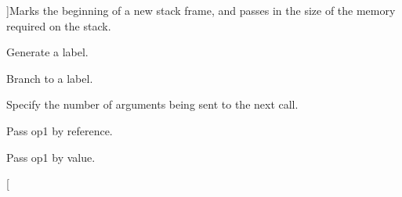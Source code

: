 \begin{Desc}
\begin{description}
{}]Marks the beginning of a new stack frame, and passes in the size of the memory required on the stack. \item[{\em 
\hypertarget{classTAC__Generator_ab58b7044cb5d16a454f4e01514175123a65bcd8393762141e07f6f31fe50fe5b9}{L\-A\-B\-E\-L}\label{classTAC__Generator_ab58b7044cb5d16a454f4e01514175123a65bcd8393762141e07f6f31fe50fe5b9}
}]Generate a label. \item[{\em 
\hypertarget{classTAC__Generator_ab58b7044cb5d16a454f4e01514175123ae86f99e1ff8f9ac1e3612a9c52175355}{B\-R}\label{classTAC__Generator_ab58b7044cb5d16a454f4e01514175123ae86f99e1ff8f9ac1e3612a9c52175355}
}]Branch to a label. \item[{\em 
\hypertarget{classTAC__Generator_ab58b7044cb5d16a454f4e01514175123a718d85ba9fd1c9b2b2c14b50407f4652}{A\-R\-G\-S}\label{classTAC__Generator_ab58b7044cb5d16a454f4e01514175123a718d85ba9fd1c9b2b2c14b50407f4652}
}]Specify the number of arguments being sent to the next call. \item[{\em 
\hypertarget{classTAC__Generator_ab58b7044cb5d16a454f4e01514175123a07ff54bea8f5c8324334f3dcb608a265}{R\-E\-F\-O\-U\-T}\label{classTAC__Generator_ab58b7044cb5d16a454f4e01514175123a07ff54bea8f5c8324334f3dcb608a265}
}]Pass op1 by reference. \item[{\em 
\hypertarget{classTAC__Generator_ab58b7044cb5d16a454f4e01514175123a78549b18a1baf838303fde2da14ddb0d}{V\-A\-L\-O\-U\-T}\label{classTAC__Generator_ab58b7044cb5d16a454f4e01514175123a78549b18a1baf838303fde2da14ddb0d}
}]Pass op1 by value. \item[{\em 
}
\end{description}
\end{Desc}
